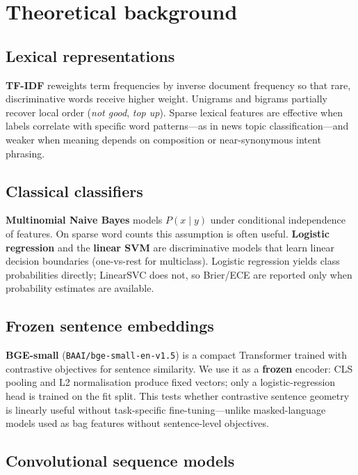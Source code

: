 \section{Theoretical background}

\subsection{Lexical representations}

\textbf{TF-IDF} reweights term frequencies by inverse document frequency so that rare, discriminative words receive higher weight. Unigrams and bigrams partially recover local order (\textit{not good}, \textit{top up}). Sparse lexical features are effective when labels correlate with specific word patterns---as in news topic classification---and weaker when meaning depends on composition or near-synonymous intent phrasing.

\subsection{Classical classifiers}

\textbf{Multinomial Naive Bayes} models $P(x \mid y)$ under conditional independence of features. On sparse word counts this assumption is often useful. \textbf{Logistic regression} and the \textbf{linear SVM} are discriminative models that learn linear decision boundaries (one-vs-rest for multiclass). Logistic regression yields class probabilities directly; LinearSVC does not, so Brier/ECE are reported only when probability estimates are available.

\subsection{Frozen sentence embeddings}

\textbf{BGE-small} (\texttt{BAAI/bge-small-en-v1.5}) is a compact Transformer trained with contrastive objectives for sentence similarity. We use it as a \textbf{frozen} encoder: CLS pooling and L2 normalisation produce fixed vectors; only a logistic-regression head is trained on the fit split. This tests whether contrastive sentence geometry is linearly useful without task-specific fine-tuning---unlike masked-language models used as bag features without sentence-level objectives.

\subsection{Convolutional sequence models}

